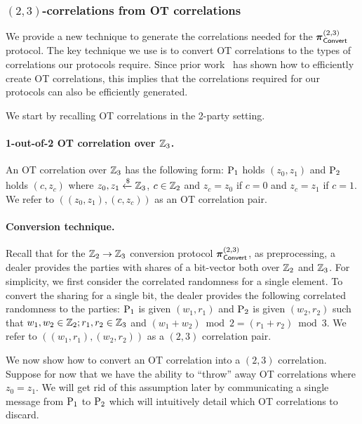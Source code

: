 \subsubsection{$(2,3)$-correlations from OT correlations}
We provide a new technique to generate the correlations needed for the $\boldsymbol{\pi}_{\textnormal{\textsf{Convert}}}^{(2,3)}$ protocol. The key technique we use is to convert OT correlations to the types of correlations our protocols require. Since prior work~\cite{?} has shown how to efficiently create OT correlations, this implies that the correlations required for our protocols can also be efficiently generated.

We start by recalling OT correlations in the 2-party setting. 

\paragraph{1-out-of-2 OT correlation over $\mathbb{Z}_3$.} An OT correlation over $\mathbb{Z}_3$ has the following form: $\textnormal{P}_1$ holds $(z_0, z_1)$ and $\textnormal{P}_2$ holds $(c, z_c)$ where $z_0, z_1 \xleftarrow{\$} \mathbb{Z}_3$, $c \in \mathbb{Z}_2$ and $z_c = z_0$ if $c=0$ and $z_c = z_1$ if $c=1$. We refer to $((z_0,z_1), (c, z_c))$ as an OT correlation pair.

\paragraph{Conversion technique.}
Recall that for the $\mathbb{Z}_2 \to \mathbb{Z}_3$ conversion protocol $\boldsymbol{\pi}_{\textnormal{\textsf{Convert}}}^{(2,3)}$, as preprocessing, a dealer provides the parties with shares of a bit-vector both over $\mathbb{Z}_2$ and $\mathbb{Z}_3$. For simplicity, we first consider the correlated randomness for a single element. To convert the sharing for a single bit, the dealer provides the following correlated randomness to the parties: $\textnormal{P}_1$ is given $(w_1, r_1)$ and $\textnormal{P}_2$ is given $(w_2, r_2)$ such that $w_1, w_2 \in \mathbb{Z}_2; r_1, r_2 \in \mathbb{Z}_3$ and $(w_1 + w_2) \bmod 2 = (r_1 + r_2) \bmod 3$. We refer to $((w_1, r_1), (w_2, r_2))$ as a $(2,3)$ correlation pair.

We now show how to convert an OT correlation into a $(2,3)$ correlation. Suppose for now that we have the ability to ``throw'' away OT correlations where $z_0 = z_1$. We will get rid of this assumption later by communicating a single message from $\textnormal{P}_1$ to $\textnormal{P}_2$ which will intuitively detail which OT correlations to discard.

